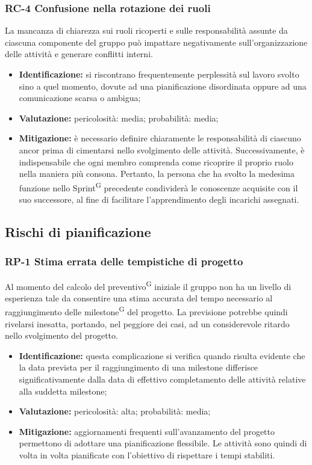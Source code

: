 \documentclass[8pt]{article}
\newcommand{\glossterm}[1]{#1\textsuperscript{G}} %
\begin{document}
\subsubsection{RC-4 Confusione nella rotazione dei ruoli}
La mancanza di chiarezza sui ruoli ricoperti e sulle responsabilità assunte da ciascuna componente del gruppo può impattare negativamente sull'organizzazione delle attività e generare conflitti interni.
\begin{itemize}
\setlength\itemsep{0em}
    \item \textbf{Identificazione:} si riscontrano frequentemente perplessità sul lavoro svolto sino a quel momento, dovute ad una pianificazione disordinata oppure ad una comunicazione scarsa o ambigua;
    \item \textbf{Valutazione:} pericolosità: media; probabilità: media;
    \item \textbf{Mitigazione:} è necessario definire chiaramente le responsabilità di ciascuno ancor prima di cimentarsi nello svolgimento delle attività. Successivamente, è indispensabile che ogni membro comprenda come ricoprire il proprio ruolo nella maniera più consona. Pertanto, la persona che ha svolto la medesima funzione nello \glossterm{Sprint} precedente condividerà le conoscenze acquisite con il suo successore, al fine di facilitare l'apprendimento degli incarichi assegnati.
\end{itemize}
\subsection{Rischi di pianificazione}
\subsubsection{RP-1 Stima errata delle tempistiche di progetto}
Al momento del calcolo del \glossterm{preventivo} iniziale il gruppo non ha un livello di esperienza tale da consentire una stima accurata del tempo necessario al raggiungimento delle \glossterm{milestone} del progetto. La previsione potrebbe quindi rivelarsi inesatta, portando, nel peggiore dei casi, ad un considerevole ritardo nello svolgimento del progetto.
\begin{itemize}
\setlength\itemsep{0em}
    \item \textbf{Identificazione:} questa complicazione si verifica quando risulta evidente che la data prevista per il raggiungimento di una milestone differisce significativamente dalla data di effettivo completamento delle attività relative alla suddetta milestone;
    \item \textbf{Valutazione:} pericolosità: alta; probabilità: media;
    \item \textbf{Mitigazione:} aggiornamenti frequenti sull'avanzamento del progetto permettono di adottare una pianificazione flessibile. Le attività sono quindi di volta in volta pianificate con l'obiettivo di rispettare i tempi stabiliti.
\end{itemize}
\end{document}
